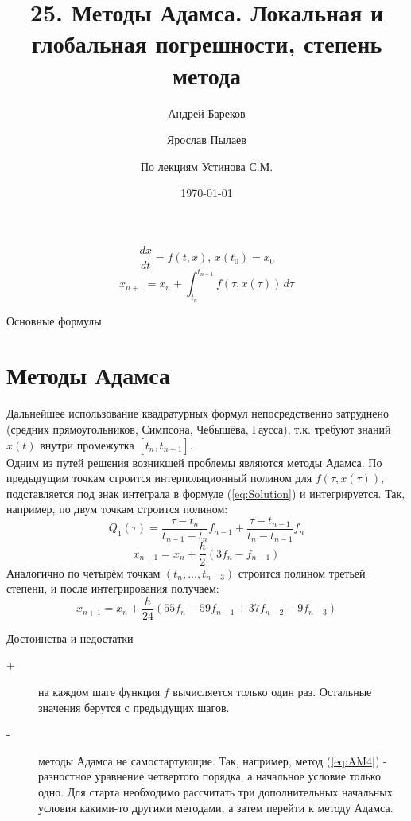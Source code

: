 \documentclass[a4paper,11pt]{article}
\title{25. Методы Адамса. Локальная и глобальная погрешности, степень метода}
\author{Андрей Бареков \and Ярослав Пылаев \and По лекциям Устинова С.М.}
\date{\today}
\begin{document}
\maketitle
\newpage

\begin{importantblock}
  \begin{equation}
    \frac{dx}{dt} = f(t, x),\, x(t_0) = x_0
    \label{eq:LDLE}
  \end{equation}
  \begin{equation}
    x_{n+1} = x_n + \int_{t_n}^{t_{n+1}} f(\tau, x(\tau))\,d\tau
    \label{eq:Solution}
  \end{equation}
  \begin{center}
    \small{Основные формулы}
  \end{center}
\end{importantblock}

\section{Методы Адамса}
Дальнейшее использование квадратурных формул непосредственно затруднено (средних прямоугольников, Симпсона, Чебышёва, Гаусса), т.к. требуют знаний $x(t)$
  внутри промежутка $[t_n, t_{n+1}]$. \\
Одним из путей решения возникшей проблемы являются методы Адамса. По предыдущим точкам строится интерполяционный полином для $f(\tau, x(\tau))$, подставляется
  под знак интеграла в формуле (\ref{eq:Solution}) и интегрируется. Так, например, по двум точкам строится полином:
\[Q_1(\tau) = \frac{\tau - t_n}{t_{n-1} - t_n}f_{n-1} + \frac{\tau - t_{n-1}}{t_n - t_{n-1}}f_n\]
\begin{equation}
  x_{n+1} = x_n + \frac{h}{2}(3f_n - f_{n-1})
  \label{eq:AM2}
\end{equation}
Аналогично по четырём точкам $(t_n, \dots, t_{n-3})$ строится полином третьей степени, и после интегрирования получаем:
\begin{equation}
  x_{n+1} = x_n + \frac{h}{24}(55f_n - 59f_{n-1} + 37f_{n-2} - 9f_{n-3})
  \label{eq:AM4}
\end{equation}
\begin{importantblock}
  \begin{center}
    Достоинства и недостатки   
  \end{center}
  \begin{description}
    \item [+] на каждом шаге функция $f$ вычисляется только один раз. Остальные значения берутся с предыдущих шагов.
    \item [-] методы Адамса не самостартующие. Так, например, метод (\ref{eq:AM4}) - разностное уравнение четвертого порядка, а начальное условие только одно.
              Для старта необходимо рассчитать три дополнительных начальных условия какими-то другими методами, а затем перейти к методу Адамса.
  \end{description}
\end{importantblock}
\end{document}
